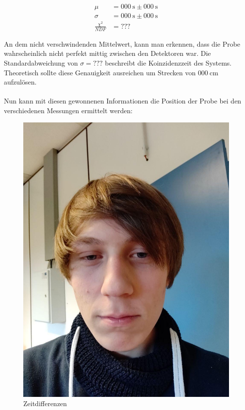\documentclass[12pt,twoside,a4paper]{scrartcl}
\begin{document}
				\begin{align*}
					\mu &= \SI{000}{\second} \pm \SI{000}{\second} \\
					\sigma &= \SI{000}{\second} \pm \SI{000}{\second} \\
					\frac{\chi^2}{NDF} &= ???
				\end{align*}

				An dem nicht verschwindenden Mittelwert, kann man erkennen, dass die Probe wahrscheinlich nicht perfekt mittig zwischen den Detektoren war.
				Die Standardabweichung von $\sigma = ???$ beschreibt die Koinzidenzzeit des Systems. Theoretisch sollte diese Genauigkeit ausreichen um Strecken von $\SI{000}{\centi \metre}$ aufzulösen.
				 \\
				 \\

				 Nun kann mit diesen gewonnenen Informationen die Position der Probe bei den verschiedenen Messungen ermittelt werden:

				 \begin{figure}[H]
				 		\centering

							\includegraphics[width=\textwidth]{Pictures/Platzhalter.jpg}

						\caption{Zeitdifferenzen}
				 \end{figure}
\end{document}
